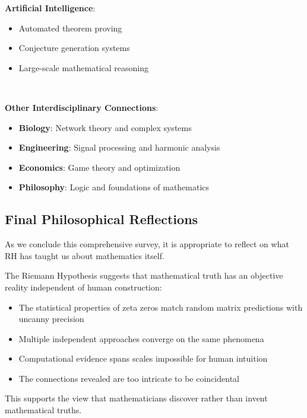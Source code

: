 \textbf{Artificial Intelligence}:
\begin{itemize}
\item Automated theorem proving
\item Conjecture generation systems
\item Large-scale mathematical reasoning
\end{itemize}

\begin{collaboration}
~
\end{collaboration}

\noindent\textbf{Other Interdisciplinary Connections}:
\begin{itemize}
\item \textbf{Biology}: Network theory and complex systems
\item \textbf{Engineering}: Signal processing and harmonic analysis
\item \textbf{Economics}: Game theory and optimization
\item \textbf{Philosophy}: Logic and foundations of mathematics
\end{itemize}

\subsection{Final Philosophical Reflections}
\label{subsec:philosophical_reflections}

As we conclude this comprehensive survey, it is appropriate to reflect on what RH has taught us about mathematics itself.

\begin{reflection}
The Riemann Hypothesis suggests that mathematical truth has an objective reality independent of human construction:
\begin{itemize}
\item The statistical properties of zeta zeros match random matrix predictions with uncanny precision
\item Multiple independent approaches converge on the same phenomena
\item Computational evidence spans scales impossible for human intuition
\item The connections revealed are too intricate to be coincidental
\end{itemize}
This supports the view that mathematicians discover rather than invent mathematical truths.
\end{reflection}

